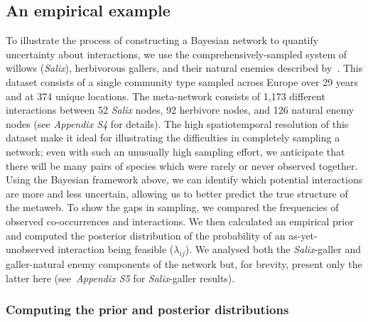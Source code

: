 \documentclass[12pt]{article}
\begin{document}
\begin{spacing}{2.0}
  \subsection*{An empirical example}

      To illustrate the process of constructing a Bayesian network to quantify uncertainty about interactions, we use the comprehensively-sampled system of willows (\emph{Salix}), herbivorous gallers, and their natural enemies described by~\citet{Kopelke2017}. This dataset consists of a single community type sampled across Europe over 29 years and at 374 unique locations. The meta-network consists of 1,173 different interactions between 52 \emph{Salix} nodes, 92 herbivore nodes, and 126 natural enemy nodes (see \emph{Appendix S4} for details). 
      The high spatiotemporal resolution of this dataset make it ideal for illustrating the difficulties in completely sampling a network; even with such an unusually high sampling effort, we anticipate that there will be many pairs of species which were rarely or never observed together. Using the Bayesian framework above, we can identify which potential interactions are more and less uncertain, allowing us to better predict the true structure of the metaweb. To show the gaps in sampling, we compared the frequencies of observed co-occurrences and interactions. We then calculated an empirical prior and computed the posterior distribution of the probability of an as-yet-unobserved interaction being feasible ($\lambda_{ij}$).
      We analysed both the \emph{Salix}-galler and galler-natural enemy components of the network but, for brevity, present only the latter here (see~\emph{Appendix S5} for \emph{Salix}-galler results).


    \subsubsection*{Computing the prior and posterior distributions}


\end{spacing}
\end{document}
